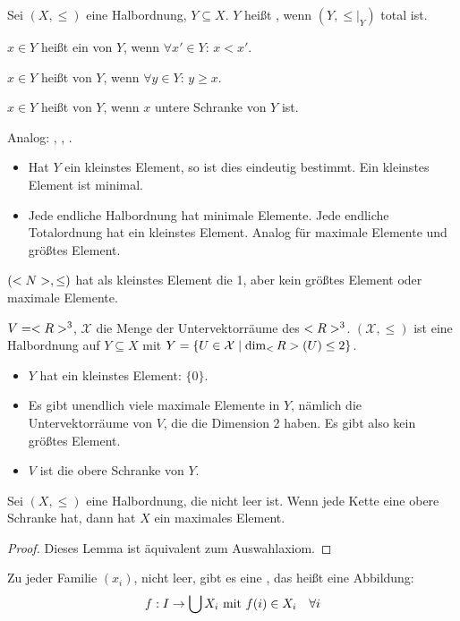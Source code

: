 \begin{definition}[Kette]
	Sei $(X,\le)$ eine Halbordnung, $Y\subseteq X$. $Y$ heißt , wenn $(Y,\le\vert_Y)$ total ist.
	
	$x\in Y$ heißt ein  von $Y$, wenn $\forall x'\in Y$: $x<x'$.
	
	$x\in Y$ heißt  von $Y$, wenn $\forall y\in Y$: $y\ge x$.
	
	$x\in Y$ heißt  von $Y$, wenn $x$ untere Schranke von $Y$ ist.
	
	Analog: , , .
\end{definition}

\begin{remark}
	\begin{itemize}
		\item Hat $Y$ ein kleinstes Element, so ist dies eindeutig bestimmt. Ein kleinstes Element ist minimal.
		\item Jede endliche Halbordnung hat minimale Elemente. Jede endliche Totalordnung hat ein kleinstes Element. Analog für maximale Elemente und größtes Element.
	\end{itemize}
\end{remark}

\begin{example}
	$(<N>,\le)$ hat als kleinstes Element die 1, aber kein größtes Element oder maximale Elemente.
\end{example}

\begin{example}
	$V=<R>^3$, $\mathcal{X}$ die Menge der Untervektorräume des $<R>^3$. $(\mathcal{X},\le)$ ist eine Halbordnung auf $Y\subseteq X$ mit $Y=\{U\in\mathcal{X}\mid \dim_\real(U)\le 2\}$. 
	\begin{itemize}
		\item $Y$ hat ein kleinstes Element: $\{0\}$.
		\item Es gibt unendlich viele maximale Elemente in $Y$, nämlich die Untervektorräume von $V$, die die Dimension 2 haben. Es gibt also kein größtes Element.
		\item $V$ ist die obere Schranke von $Y$.
	\end{itemize}
\end{example}

\begin{theorem}
	Sei $(X,\le)$ eine Halbordnung, die nicht leer ist. Wenn jede Kette eine obere Schranke hat, dann hat $X$ ein maximales Element.
\end{theorem}
\begin{proof}
	Dieses Lemma ist äquivalent zum Auswahlaxiom. \frownie{}
\end{proof}

\begin{conclusion}
	Zu jeder Familie $(x_i)$, nicht leer, gibt es eine , das heißt eine Abbildung:
	\begin{align}
		f: I\to \bigcup X_i\text{ mit } f(i)\in X_i\quad\forall i\notag
	\end{align}
\end{conclusion}